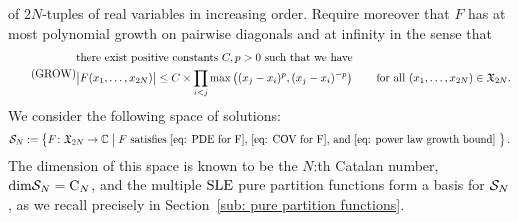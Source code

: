 \documentclass[oneside,english]{amsart}
\numberwithin{equation}{section}
\numberwithin{figure}{section}
\theoremstyle{plain}
\theoremstyle{plain}
\theoremstyle{plain}
\theoremstyle{remark}
\theoremstyle{plain}
\theoremstyle{plain}
\theoremstyle{plain}
\theoremstyle{plain}
\theoremstyle{plain}
\theoremstyle{plain}
\theoremstyle{plain}
\theoremstyle{plain}
\newcommand{\alexmod}[1]{{\color{allucol} #1}}
\newcommand{\blue}[1]{{\color{blue} #1}}
\begin{document}
of $2N$-tuples of real variables in increasing order. %
Require moreover
that $F$ has
at most polynomial growth on pairwise diagonals and at infinity in the sense that
\begin{align} 
\label{eq: power law growth bound} \tag{GROW}
\begin{split}
& \text{there exist positive constants $C,p > 0$ such that we have }  \\
& \big| F(x_1,\ldots,x_{2N}) \big| \leq C \times
\prod_{i < j} \max\left( (x_j - x_i)^p, (x_j - x_i)^{-p} \right)
\qquad \text{for all } (x_1,\ldots,x_{2N}) \in \mathfrak{X}_{2N}.
\end{split}
\end{align}
We consider the following space of solutions:
\begin{align*} %
\Sol_N := \set{ F \colon \chamber_{2N} \to \bC \;\big|\; F \text{ satisfies 
\eqref{eq: PDE for F},~\eqref{eq: COV for F},
and~\eqref{eq: power law growth bound} } }.
\end{align*}
The dimension of this space is known to be the $N$:th Catalan number, $\mathrm{dim} \mathcal{S}_N = \mathrm{C}_N$,
and %
the multiple $\mathrm{SLE}$ pure partition functions
form a basis for $\mathcal{S}_N$,
as we %
recall precisely in Section~\ref{sub: pure partition functions}. 
\end{document}

